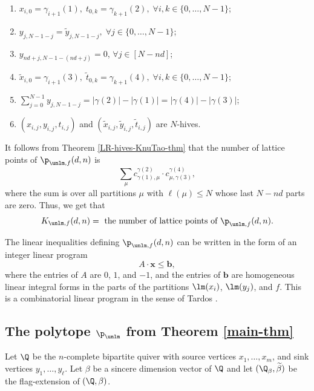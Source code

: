 \begin{enumerate}
\item $x_{i,0} = \gamma_{i+1}(1), \; t_{0,k} = \gamma_{k+1}(2), \; \forall i,k \in \{0,\ldots, N-1\}$;

\item $y_{j,N-1-j} = \widetilde{y}_{j,N-1-j}, \; \forall j \in \{0,\ldots, N-1\}$;

\item $y_{nd+j, N-1-(nd+j)}=0$, $\forall j \in [N-nd]$;

\item $\widetilde{x}_{i,0} = \gamma_{i+1}(3), \; \widetilde{t}_{0,k} = \gamma_{k+1}(4), \; \forall i,k \in \{0,\ldots, N-1\}$;
\item $\sum_{j=0}^{N-1} y_{j, N-1-j} = |\gamma(2)| - |\gamma(1)| = |\gamma(4)|-|\gamma(3)|$;
\item $(x_{i,j},y_{i,j},t_{i,j})$ and $(\widetilde{x}_{i,j}, \widetilde{y}_{i,j}, \widetilde{t}_{i,j})$ are $N$-hives.
\end{enumerate}
It follows from Theorem \ref{LR-hives-KnuTao-thm} that the number of lattice points of $\p_{\unlm, f}(d,n)$ is 
\[
\sum_{\mu} c^{\gamma(2)}_{\gamma(1),\mu} \cdot c^{\gamma(4)}_{\mu,\gamma(3)},
\]
where the sum is over all partitions $\mu$ with $\ell(\mu) \leq N$ whose last $N-nd$ parts are zero. Thus, we get that
\begin{equation}\label{lattice-points-poly-eqn-1}
K_{\unlm, f}(d, n)=\text{~the number of lattice points of~}\p_{\unlm, f}(d,n).
\end{equation}
\begin{rema} \label{comb-linear-program-rmk} The linear inequalities defining $\p_{\unlm, f}(d,n)$ can be written in the form of an  integer linear program
$$
A\cdot \mathbf{x} \leq \mathbf{b},
$$
where the entries of $A$ are $0$, $1$, and $-1$, and the  entries of $\mathbf{b}$ are homogeneous linear integral forms in the parts of the partitions $\lm(x_i)$, $\lm(y_j)$, and $f$. This is a combinatorial linear program in the sense of Tardos \cite{Tar86}.
\end{rema}

\subsection{The polytope \texorpdfstring{$\p_{\unlm}$}{P\_lambda} from Theorem \ref{main-thm}}\label{our-polytope-sec} Let $\Q$ be the $n$-complete bipartite quiver with source vertices $x_1, \ldots, x_m$, and sink vertices $y_1, \ldots, y_\ell$. Let $\beta$ be a sincere dimension vector of $\Q$ and let $(\Q_\beta, \widetilde{\beta})$ be the flag-extension of $(\Q, \beta)$.


